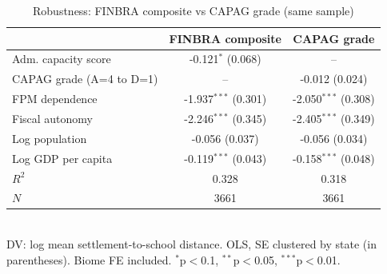 \begin{table}[h]
\centering
\caption{Robustness: FINBRA composite vs CAPAG grade (same sample)}
\begin{tabular}{lcc}
\toprule
& FINBRA composite & CAPAG grade \\
\midrule
Adm. capacity score & -0.121$^{*}$ (0.068) & -- \\
CAPAG grade (A=4 to D=1) & -- & -0.012 (0.024) \\
FPM dependence & -1.937$^{***}$ (0.301) & -2.050$^{***}$ (0.308) \\
Fiscal autonomy & -2.246$^{***}$ (0.345) & -2.405$^{***}$ (0.349) \\
Log population & -0.056 (0.037) & -0.056 (0.034) \\
Log GDP per capita & -0.119$^{***}$ (0.043) & -0.158$^{***}$ (0.048) \\
\midrule
$R^2$ & 0.328 & 0.318 \\
$N$ & 3661 & 3661 \\
\bottomrule
\end{tabular}
\\[4pt]
\footnotesize{DV: log mean settlement-to-school distance. OLS, SE clustered by state (in parentheses). Biome FE included. $^{*}$p$<$0.1, $^{**}$p$<$0.05, $^{***}$p$<$0.01.}
\end{table}
